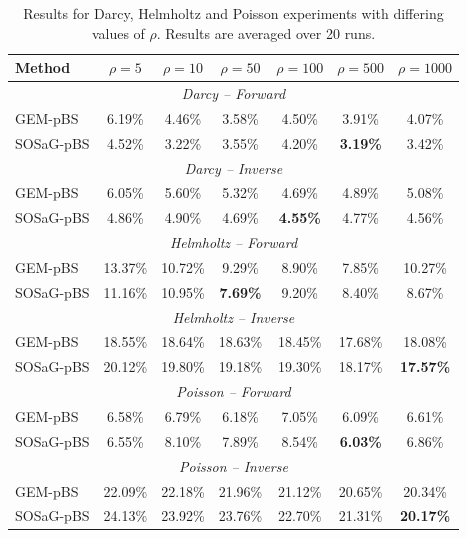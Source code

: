 \begin{table}[ht]
\centering
\caption{Results for Darcy, Helmholtz and Poisson experiments with differing values of $\rho$. Results are averaged over 20 runs.}
\label{tab:results_tempering}
\setlength{\tabcolsep}{6pt}
\begin{tabular}{l cccccc}
\toprule
Method & $\rho{=}5$ & $\rho{=}10$ & $\rho{=}50$ & $\rho{=}100$ & $\rho{=}500$ & $\rho{=}1000$ \\
\midrule

\multicolumn{7}{c}{\textit{Darcy -- Forward}} \\
\midrule
GEM-pBS   & 6.19\% & 4.46\% & 3.58\% & 4.50\% & 3.91\%          & 4.07\% \\
SOSaG-pBS & 4.52\% & 3.22\% & 3.55\% & 4.20\% & \textbf{3.19\%} & 3.42\% \\
\midrule

\multicolumn{7}{c}{\textit{Darcy -- Inverse}} \\
\midrule
GEM-pBS   & 6.05\% & 5.60\% & 5.32\% & 4.69\%          & 4.89\% & 5.08\% \\
SOSaG-pBS & 4.86\% & 4.90\% & 4.69\% & \textbf{4.55\%} & 4.77\% & 4.56\% \\
\midrule

\multicolumn{7}{c}{\textit{Helmholtz -- Forward}} \\
\midrule
GEM-pBS   & 13.37\% & 10.72\% &  9.29\%         & 8.90\% & 7.85\% & 10.27\% \\
SOSaG-pBS & 11.16\% & 10.95\% & \textbf{7.69\%} & 9.20\% & 8.40\% &  8.67\% \\
\midrule

\multicolumn{7}{c}{\textit{Helmholtz -- Inverse}} \\
\midrule
GEM-pBS   & 18.55\% & 18.64\% & 18.63\% & 18.45\% & 17.68\% & 18.08\%          \\
SOSaG-pBS & 20.12\% & 19.80\% & 19.18\% & 19.30\% & 18.17\% & \textbf{17.57\%} \\
\midrule

\multicolumn{7}{c}{\textit{Poisson -- Forward}} \\
\midrule
GEM-pBS   & 6.58\% & 6.79\% & 6.18\% & 7.05\% & 6.09\%          & 6.61\% \\
SOSaG-pBS & 6.55\% & 8.10\% & 7.89\% & 8.54\% & \textbf{6.03\%} & 6.86\% \\
\midrule

\multicolumn{7}{c}{\textit{Poisson -- Inverse}} \\
\midrule
GEM-pBS   & 22.09\% & 22.18\% & 21.96\% & 21.12\% & 20.65\% & 20.34\%          \\
SOSaG-pBS & 24.13\% & 23.92\% & 23.76\% & 22.70\% & 21.31\% & \textbf{20.17\%} \\

\bottomrule
\end{tabular}
\end{table}

